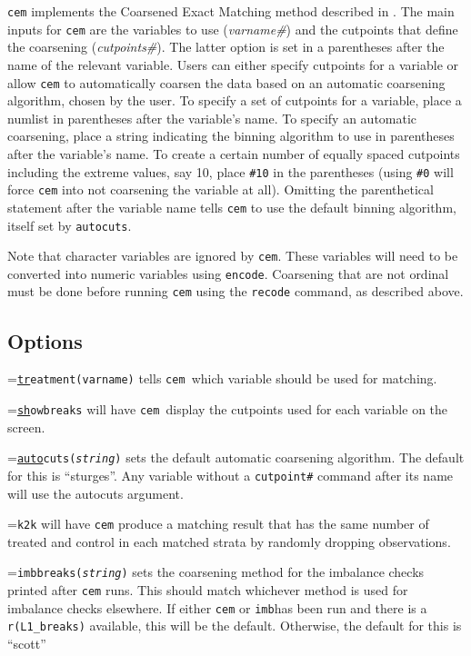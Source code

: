 \documentclass[11pt,titlepage]{article}
\newcommand{\cem}{\texttt{cem }}
\begin{document}
\texttt{cem} implements the Coarsened Exact Matching method described in
\citet{IacKinPor12}. The main inputs for \texttt{cem} are the
variables to use (\textit{varname\#}) and the cutpoints that define the
coarsening (\textit{cutpoints\#}). The latter option is set in a
parentheses after the name of the relevant variable. Users can either
specify cutpoints for a variable or allow \texttt{cem} to automatically
coarsen the data based on an automatic coarsening algorithm, chosen by the
user.  To specify a set of cutpoints for a variable, place a numlist in
parentheses after the variable's name. To specify an automatic coarsening,
place a string indicating the binning algorithm to use in parentheses
after the variable's name. To create a certain number of equally
spaced cutpoints including the extreme values, say 10, place \texttt{\#10} in the parentheses (using \texttt{\#0}
will force \texttt{cem} into not coarsening the variable at all). Omitting
the parenthetical statement after the variable name tells \texttt{cem} to
use the default binning algorithm, itself set by \texttt{autocuts}.

Note that character variables are ignored by \texttt{cem}. These variables
will need to be converted into numeric variables using
\texttt{encode}. Coarsening that are not ordinal must be done before
running \texttt{cem} using the \texttt{recode} command, as described
above. 


\subsection{Options}
\hangindent=\parindent{}\noindent \texttt{\underline{tr}eatment(varname)} tells \cem which
variable should be used for matching.


\hangindent=\parindent{}\noindent\texttt{\underline{sh}owbreaks} will have \cem display the
cutpoints used for each variable on the screen.

\hangindent=\parindent{}\noindent\texttt{\underline{auto}cuts({\it string})} sets the default automatic
coarsening algorithm. The default for this is ``sturges''. Any variable
without a \texttt{cutpoint\#} command after its name will use the autocuts
argument.
  
\hangindent=\parindent{}\noindent\texttt{k2k} will have \texttt{cem} produce a matching result
that has the same number of treated and control in each matched strata by
randomly dropping observations.
  
\hangindent=\parindent{}\noindent\texttt{imbbreaks({\it string})} sets the coarsening method for the
imbalance checks printed after \texttt{cem} runs. This should match
whichever method is used for imbalance checks elsewhere. If either
\texttt{cem} or \texttt{imb}has been run and there is a
\texttt{r(L1\_breaks)} available, this will be the default.  Otherwise, the
default for this is ``scott''
\end{document}
